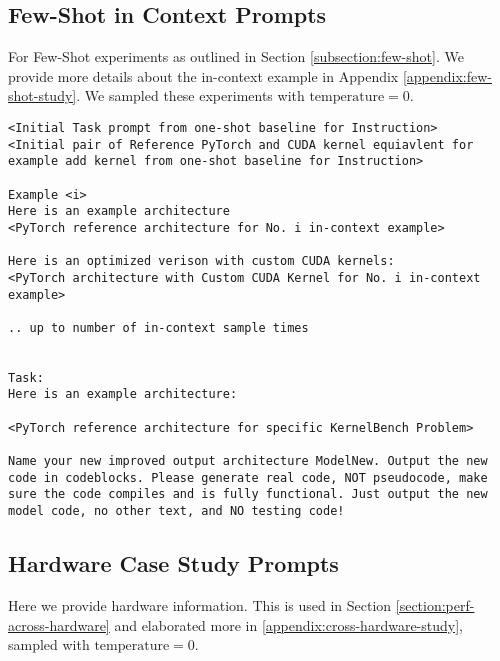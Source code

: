 \subsection{Few-Shot in Context Prompts} \label{appendix:few-shot-study-prompts}
For Few-Shot experiments as outlined in Section \ref{subsection:few-shot}. We provide more details about the in-context example in Appendix \ref{appendix:few-shot-study}. We sampled these experiments with $\text{temperature}=0$.  
\begin{lstlisting}
<Initial Task prompt from one-shot baseline for Instruction>
<Initial pair of Reference PyTorch and CUDA kernel equiavlent for example add kernel from one-shot baseline for Instruction>

Example <i>
Here is an example architecture
<PyTorch reference architecture for No. i in-context example>

Here is an optimized verison with custom CUDA kernels: 
<PyTorch architecture with Custom CUDA Kernel for No. i in-context example>

.. up to number of in-context sample times


Task:
Here is an example architecture:

<PyTorch reference architecture for specific KernelBench Problem>

Name your new improved output architecture ModelNew. Output the new code in codeblocks. Please generate real code, NOT pseudocode, make sure the code compiles and is fully functional. Just output the new model code, no other text, and NO testing code!
\end{lstlisting}

\subsection{Hardware Case Study Prompts} \label{appendix:hardware-case-study-prompts}

Here we provide hardware information. This is used in Section \ref{section:perf-across-hardware} and elaborated more in \ref{appendix:cross-hardware-study}, sampled with $\text{temperature}=0$.  

